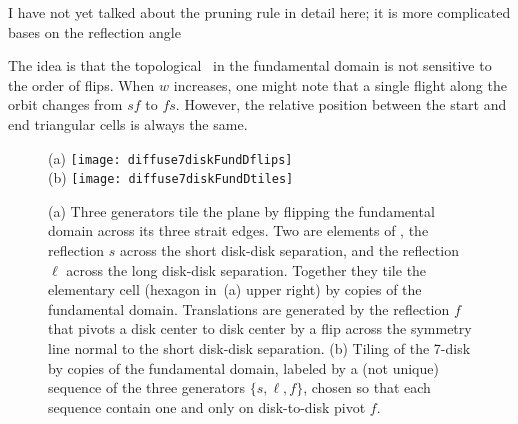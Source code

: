 


      {I have not yet talked about the pruning rule in
     detail here; it is more complicated bases on the reflection
     angle}

    {The idea is that the topological \po\ in the
    fundamental domain is not sensitive to the order of flips. When
    $w$ increases, one might note that a single flight along the
    orbit changes from $sf$ to $fs$. However, the relative position
    between the start and end triangular cells is always the same.}

\begin{figure}[htbp]
  \begin{center}
    (a) \texttt{[image: diffuse7diskFundDflips]}
    \\
    (b) \texttt{[image: diffuse7diskFundDtiles]}
  \end{center}
  \caption{\label{fig-7diskFundDflips}
  (a) Three generators tile the plane by flipping the fundamental
  domain across its three strait edges. Two are elements of ,
  the reflection  $s$ across the short disk-disk separation, and the
  reflection $\ell$ across the long disk-disk separation. Together
  they tile the elementary cell (hexagon in
  \,(a) upper right) by copies of the
  fundamental domain. Translations are generated by the reflection $f$
  that pivots a disk center to disk center by a flip across the
  symmetry line normal to the short disk-disk separation. (b) Tiling
  of the 7-disk by copies of the fundamental domain, labeled by a (not
  unique) sequence of the three generators  $\{s,\ell,f\}$, chosen so
  that each sequence contain one and only on  disk-to-disk pivot $f$.
  }
\end{figure}


